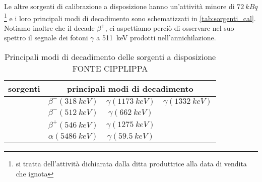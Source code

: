 Le altre sorgenti di calibrazione a disposizione hanno un'attività minore di $\SI{72}{kBq}$\footnote{si tratta dell'attività dichiarata dalla ditta produttrice alla data di vendita che ignota} e i loro principali modi di decadimento sono schematizzati in \autoref{tab:sorgenti_cal}. Notiamo inoltre che il \na\; decade $\beta^+$, ci aspettiamo perciò di osservare nel suo spettro il segnale dei fotoni $\gamma$ a \SI{511}{keV} prodotti nell'annichilazione.

\begin{table}
	\centering
	\begin{tabular}{c|ccc}
		sorgenti & \multicolumn{3}{c}{principali modi di decadimento} \\ \hline
		\co & $\beta^{-} (\SI{318}{keV})$ & $\gamma (\SI{1173}{keV})$ & $\gamma (\SI{1332}{keV})$  \\
		\cs & $\beta^{-} (\SI{512}{keV})$ & $\gamma (\SI{662}{keV})$ \\
		\na & $\beta^{+} (\SI{546}{keV})$ & $\gamma (\SI{1275}{keV})$ \\
		\am & $\alpha (\SI{5486}{keV})$ & $\gamma (\SI{59.5}{keV})$ \\ \hline
	\end{tabular}
	\caption{\label{tab:sorgenti_cal} Principali modi di decadimento delle sorgenti a disposizione FONTE CIPPLIPPA}
\end{table} 

